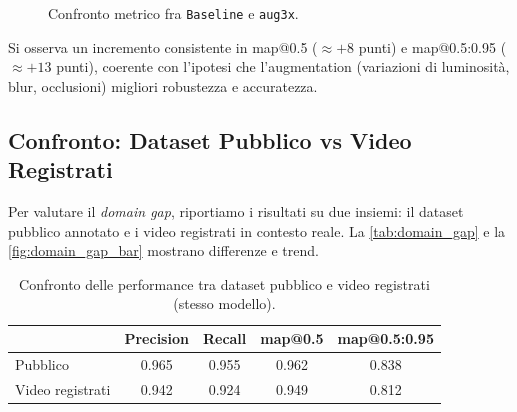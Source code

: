 \documentclass[12pt,a4paper,openright,twoside]{book}
\begin{document}
\begin{figure}[t]
  \centering
  \caption{Confronto metrico fra \texttt{Baseline} e \texttt{aug3x}.}
  \label{fig:bar_ablation}
\end{figure}

Si osserva un incremento consistente in \ac{map}@0.5 ($\approx +8$ punti) e \ac{map}@0.5:0.95 ($\approx +13$ punti), 
coerente con l'ipotesi che l'augmentation (variazioni di luminosità, blur, occlusioni) migliori robustezza e accuratezza.

\subsection{Confronto: Dataset Pubblico vs Video Registrati}
Per valutare il \emph{domain gap}, riportiamo i risultati su due insiemi: il dataset pubblico annotato e i video registrati in contesto reale. 
La \autoref{tab:domain_gap} e la \autoref{fig:domain_gap_bar} mostrano differenze e trend.

\begin{table}[t]
  \centering
  \caption{Confronto delle performance tra dataset pubblico e video registrati (stesso modello).}
  \label{tab:domain_gap}
  \begin{tabular}{l S[table-format=1.3] S[table-format=1.3] S[table-format=1.3] S[table-format=1.3]}
    \toprule
    & {\textbf{Precision}} & {\textbf{Recall}} & {\textbf{\ac{map}@0.5}} & {\textbf{\ac{map}@0.5:0.95}} \\
    \midrule
    Pubblico        & 0.965 & 0.955 & 0.962 & 0.838 \\
    Video registrati & 0.942 & 0.924 & 0.949 & 0.812 \\
    \bottomrule
  \end{tabular}
\end{table}
\end{document}
